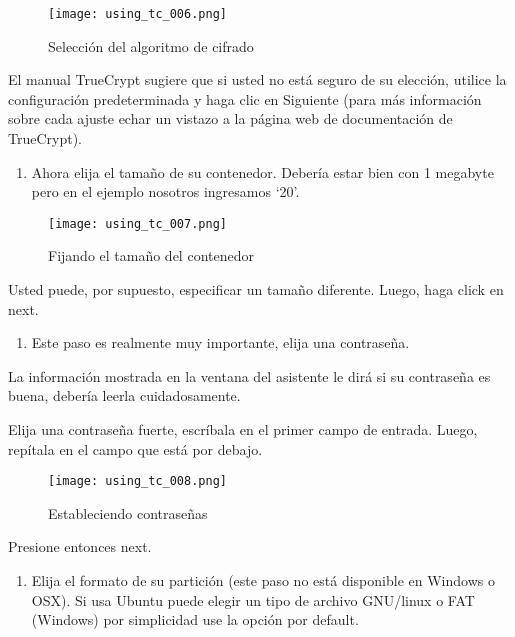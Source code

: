 \documentclass[10pt,a5paper,twoside,,]{book}
\providecommand{\tightlist}{%
  \setlength{\itemsep}{0pt}\setlength{\parskip}{0pt}}
\begin{document}
\begin{figure}[htbp]
\centering
\texttt{[image: using\_tc\_006.png]}
\caption{Selección del algoritmo de cifrado}
\end{figure}

El manual TrueCrypt sugiere que si usted no está seguro de su elección,
utilice la configuración predeterminada y haga clic en Siguiente (para
más información sobre cada ajuste echar un vistazo a la página web de
documentación de TrueCrypt).

\begin{enumerate}
\def\labelenumi{\arabic{enumi}.}
\setcounter{enumi}{7}
\tightlist
\item
  Ahora elija el tamaño de su contenedor. Debería estar bien con 1
  megabyte pero en el ejemplo nosotros ingresamos `20'.
\end{enumerate}

\begin{figure}[htbp]
\centering
\texttt{[image: using\_tc\_007.png]}
\caption{Fijando el tamaño del contenedor}
\end{figure}

Usted puede, por supuesto, especificar un tamaño diferente. Luego, haga
click en next.

\begin{enumerate}
\def\labelenumi{\arabic{enumi}.}
\setcounter{enumi}{8}
\tightlist
\item
  Este paso es realmente muy importante, elija una contraseña.
\end{enumerate}

La información mostrada en la ventana del asistente le dirá si su
contraseña es buena, debería leerla cuidadosamente.

Elija una contraseña fuerte, escríbala en el primer campo de entrada.
Luego, repítala en el campo que está por debajo.

\begin{figure}[htbp]
\centering
\texttt{[image: using\_tc\_008.png]}
\caption{Estableciendo contraseñas}
\end{figure}

Presione entonces next.

\begin{enumerate}
\def\labelenumi{\arabic{enumi}.}
\setcounter{enumi}{9}
\tightlist
\item
  Elija el formato de su partición (este paso no está disponible en
  Windows o OSX). Si usa Ubuntu puede elegir un tipo de archivo
  GNU/linux o FAT (Windows) por simplicidad use la opción por default.
\end{enumerate}
\end{document}
